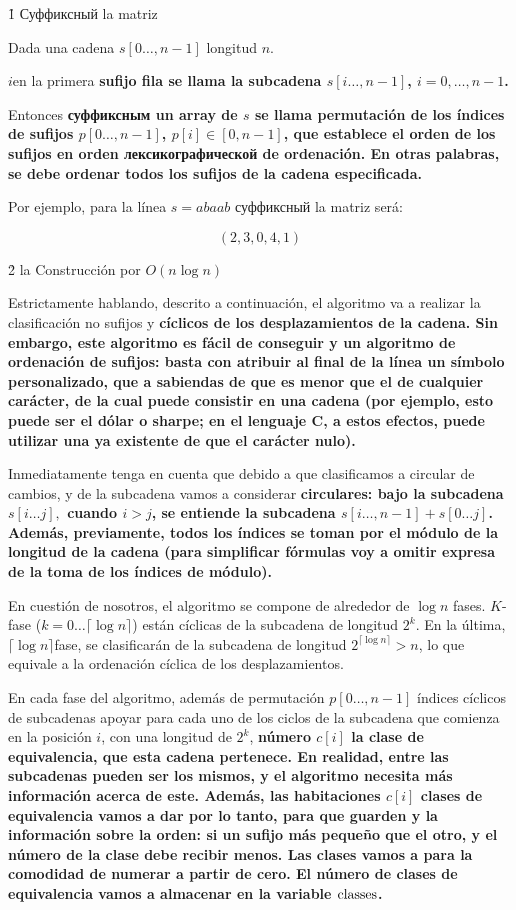 \h1{ Суффиксный la matriz }

Dada una cadena $s[0 \ldots, n-1]$ longitud $n$.

$i$en la primera \bf{sufijo} fila se llama la subcadena $s[i \ldots, n-1]$, $i=0, \ldots, n-1$.

Entonces \bf{суффиксным un array} de $s$ se llama permutación de los índices de sufijos $p[0 \ldots, n-1]$, $p[i] \in [0, n-1]$, que establece el orden de los sufijos en orden лексикографической de ordenación. En otras palabras, se debe ordenar todos los sufijos de la cadena especificada.

Por ejemplo, para la línea $s=abaab$ суффиксный la matriz será:

$$ (2,3,0,4,1) $$


\h2{ la Construcción por $O (n \log n)$ }

Estrictamente hablando, descrito a continuación, el algoritmo va a realizar la clasificación no sufijos y \bf{cíclicos de los desplazamientos} de la cadena. Sin embargo, este algoritmo es fácil de conseguir y un algoritmo de ordenación de sufijos: basta con atribuir al final de la línea un símbolo personalizado, que a sabiendas de que es menor que el de cualquier carácter, de la cual puede consistir en una cadena (por ejemplo, esto puede ser el dólar o sharpe; en el lenguaje C, a estos efectos, puede utilizar una ya existente de que el carácter nulo).

Inmediatamente tenga en cuenta que debido a que clasificamos a circular de cambios, y de la subcadena vamos a considerar \bf{circulares}: bajo la subcadena $s[i \ldots j],$ cuando $i > j$, se entiende la subcadena $s[i \ldots, n-1] + s[0 \ldots j]$. Además, previamente, todos los índices se toman por el módulo de la longitud de la cadena (para simplificar fórmulas voy a omitir expresa de la toma de los índices de módulo).

En cuestión de nosotros, el algoritmo se compone de alrededor de $\log n$ fases. $K$-fase ($k = 0 \ldots \lceil \log n \rceil$) están cíclicas de la subcadena de longitud $2^k$. En la última, $\lceil \log n \rceil$fase, se clasificarán de la subcadena de longitud $2^{\lceil \log n \rceil} > n$, lo que equivale a la ordenación cíclica de los desplazamientos.

En cada fase del algoritmo, además de permutación $p[0 \ldots, n-1]$ índices cíclicos de subcadenas apoyar para cada uno de los ciclos de la subcadena que comienza en la posición $i$, con una longitud de $2^k$, \bf{número $c[i]$ la clase de equivalencia}, que esta cadena pertenece. En realidad, entre las subcadenas pueden ser los mismos, y el algoritmo necesita más información acerca de este. Además, las habitaciones $c[i]$ clases de equivalencia vamos a dar por lo tanto, para que guarden y la información sobre la orden: si un sufijo más pequeño que el otro, y el número de la clase debe recibir menos. Las clases vamos a para la comodidad de numerar a partir de cero. El número de clases de equivalencia vamos a almacenar en la variable $\rm classes$.

